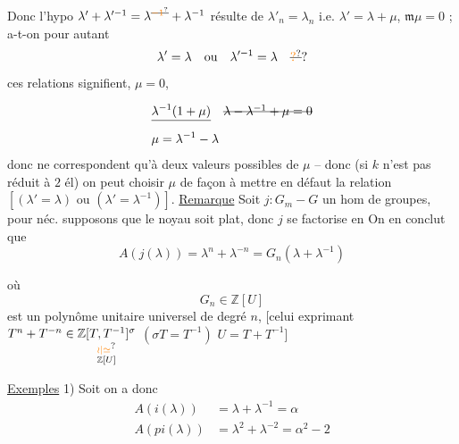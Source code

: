 Donc l'hypo $\lambda'+\lambda'^{-1}=\lambda^{\deleted{\unsure{-1}}}+\lambda^{-1}$ résulte de $\lambda'_n=\lambda_n$ i.e. $\lambda'=\lambda+\mu$, $\mathfrak m\mu=0$  ; a-t-on pour autant
\[
\lambda'=\lambda\quad\text{ou}\quad\lambda'^{-1}=\lambda\quad\deleted{\unsure{?}}?
\]
  ces relations signifient,   $\mu=0$,

  
\[
\begin{aligned}
&\deleted{\lambda^{-1}(1+\mu)}\quad\deleted{\lambda-\lambda^{-1}+\mu=0}\\
&\mu=\lambda^{-1}-\lambda
\end{aligned}
\]
donc ne correspondent qu'à deux valeurs possibles  de $\mu$ -- donc (si $k$ n'est pas réduit à $2$ él) on peut choisir $\mu$ de façon à mettre en défaut la relation $[(\lambda'=\lambda)\text{ ou }(\lambda'=\lambda^{-1})]$.
\uline{Remarque} Soit $j:G_m\mathbin{-}G$ un hom de groupes, pour néc.   supposons que le noyau soit plat, donc $j$ se factorise en
On en conclut que
\[
A(j(\lambda))=\lambda^n+\lambda^{-n}=G_n(\lambda+\lambda^{-1})
\]

où
\[
G_n\in\mathbb Z[U]
\]
est un polynôme unitaire universel de degré $n$, [celui exprimant $T^n+T^{-n}\in\underset{\substack{\unsure{\wr|\simeq}\\\mathbb Z[U]}}{\mathbb Z[T,T^{-1}]^\sigma}$ $(\sigma T=T^{-1})$  $U=T+T^{-1}$]

\uline{Exemples} 1) Soit
on a donc
\[
\begin{aligned}
A(i(\lambda))&=\lambda+\lambda^{-1}=\alpha\\
A(pi(\lambda))&=\lambda^2+\lambda^{-2}=\alpha^2-2
\end{aligned}
\]

